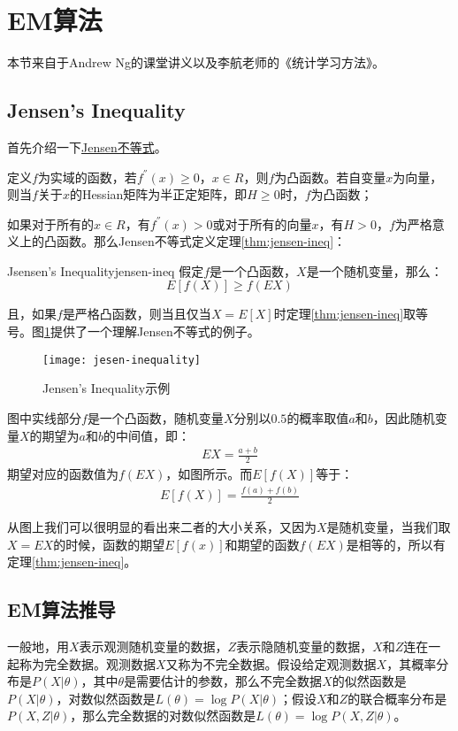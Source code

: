\section{EM算法}
\label{sec:em}
本节来自于Andrew Ng的课堂讲义以及李航老师的《统计学习方法》。

\subsection{Jensen's Inequality}
首先介绍一下\href{https://en.wikipedia.org/wiki/Jensen\%27s_inequality}{Jensen不等式}。

定义$f$为实域的函数，若$f^{''}(x) \geq 0$，$x\in{R}$，则$f$为凸函数。若自变量$x$为向量，则当$f$关于$x$的Hessian矩阵为半正定矩阵，即$H \geq 0$时，$f$为凸函数；

如果对于所有的$x\in{R}$，有$f^{''}(x)>0$或对于所有的向量$x$，有$H>0$，$f$为严格意义上的凸函数。那么Jensen不等式定义定理\ref{thm:jensen-ineq}：
\begin{theorem}{Jsensen's Inequality}{jensen-ineq}
假定$f$是一个凸函数，$X$是一个随机变量，那么：
\begin{equation}
E[f(X)] \geq f(EX)
\end{equation}
\end{theorem}

且，如果$f$是严格凸函数，则当且仅当$X=E[X]$时定理\ref{thm:jensen-ineq}取等号。图\ref{fig:jesen-inequality}提供了一个理解Jensen不等式的例子。
\begin{figure}[h]
  \centering
  \texttt{[image: jesen-inequality]}
  \caption{Jensen's Inequality示例 \label{fig:jesen-inequality}}
\end{figure}

图中实线部分$f$是一个凸函数，随机变量$X$分别以$0.5$的概率取值$a$和$b$，因此随机变量$X$的期望为$a$和$b$的中间值，即：
\begin{align}
\label{eqn:exam-jsen}
  EX = \frac{a+b}{2}
\end{align}
期望对应的函数值为$f(EX)$，如图所示。而$E[f(X)]$等于：
\begin{align}
\label{eqn:exam-jsen1}
  E[f(X)] = \frac{f(a)+f(b)}{2}
\end{align}

从图上我们可以很明显的看出来二者的大小关系，又因为$X$是随机变量，当我们取$X=EX$的时候，函数的期望$E[f(x)]$和期望的函数$f(EX)$是相等的，所以有定理\ref{thm:jensen-ineq}。

\subsection{EM算法推导}
一般地，用$X$表示观测随机变量的数据，$Z$表示隐随机变量的数据，$X$和$Z$连在一起称为完全数据。观测数据$X$又称为不完全数据。假设给定观测数据$X$，其概率分布是$P(X|\theta)$，其中$\theta$是需要估计的参数，那么不完全数据$X$的似然函数是$P(X|\theta)$，对数似然函数是$L(\theta)=\log P(X|\theta)$；假设$X$和$Z$的联合概率分布是$P(X,Z|\theta)$，那么完全数据的对数似然函数是$L(\theta)=\log P(X,Z|\theta)$。

